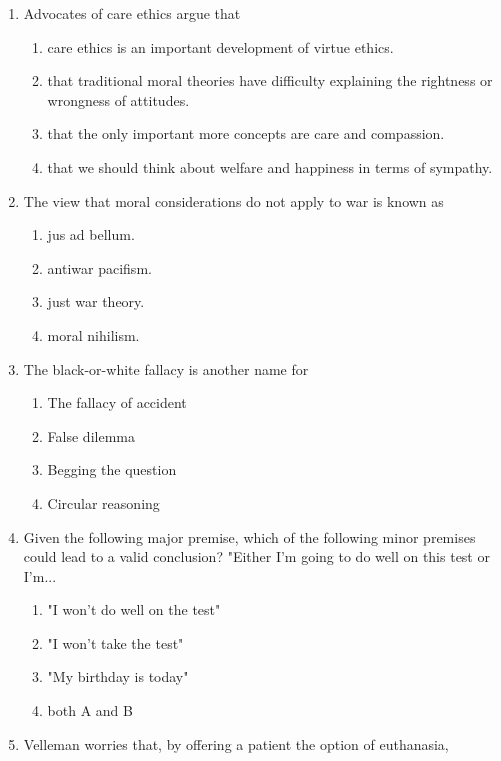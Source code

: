 \documentclass[12pt]{article}
\begin{document}
\begin{enumerate}[label=\arabic*.]
\begin{enumerate}[label=(\alph*)]
    \item none of the above
\end{enumerate}
\item Advocates of care ethics argue that
\begin{enumerate}[label=(\alph*)]
    \item care ethics is an important development of virtue ethics.
    \item that traditional moral theories have difficulty explaining the rightness or wrongness of attitudes.
    \item that the only important more concepts are care and compassion.
    \item that we should think about welfare and happiness in terms of sympathy.
\end{enumerate}
\item The view that moral considerations do not apply to war is known as
\begin{enumerate}[label=(\alph*)]
    \item jus ad bellum.
    \item antiwar pacifism.
    \item just war theory.
    \item moral nihilism.
\end{enumerate}
\item The black-or-white fallacy is another name for
\begin{enumerate}[label=(\alph*)]
    \item The fallacy of accident
    \item False dilemma
    \item Begging the question
    \item Circular reasoning
\end{enumerate}
\item Given the following major premise, which of the following minor premises could lead to a valid conclusion? "Either I'm going to do well on this test or I'm...
\begin{enumerate}[label=(\alph*)]
    \item "I won't do well on the test"
    \item "I won't take the test"
    \item "My birthday is today"
    \item both A and B
\end{enumerate}
\item Velleman worries that, by offering a patient the option of euthanasia,
\begin{enumerate}[label=(\alph*)]

\end{enumerate}
\end{enumerate}
\end{document}
